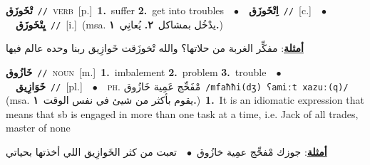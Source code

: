 \documentclass[10pt,a4paper,twoside]{article} %
\begin{document}
\begin{multicols}{2}
{\setlength\topsep{0pt}\textbf{\foreignlanguage{arabic}{تْخَوزَق}}\ {\color{gray}\texttt{//}\color{black}}\ \textsc{verb}\ [p.]\ \textbf{1.}~suffer  \textbf{2.}~get into troubles\ \ $\bullet$\ \ \setlength\topsep{0pt}\textbf{\foreignlanguage{arabic}{اِتْخَوزَق}}\ {\color{gray}\texttt{//}\color{black}}\ [c.]\ \ $\bullet$\ \ \setlength\topsep{0pt}\textbf{\foreignlanguage{arabic}{يِتْخَوزَق}}\ {\color{gray}\texttt{//}\color{black}}\ [i.]\ \color{gray}(msa. \foreignlanguage{arabic}{يدْخُل بمشاكل}~\foreignlanguage{arabic}{\textbf{٢.}}  \foreignlanguage{arabic}{يُعانِي}~\foreignlanguage{arabic}{\textbf{١.}})\color{black}\  \begin{flushright}\color{gray}\foreignlanguage{arabic}{\textbf{\underline{\foreignlanguage{arabic}{أمثلة}}}: مفكِّر الغربة من حلاتها؟ والله تْخوزَقت خَوازِيق ربنا وحده عالم فيها}\end{flushright}\color{black}} \vspace{2mm}

{\setlength\topsep{0pt}\textbf{\foreignlanguage{arabic}{خَازُوق}}\ {\color{gray}\texttt{//}\color{black}}\ \textsc{noun}\ [m.]\ \textbf{1.}~imbalement  \textbf{2.}~problem  \textbf{3.}~trouble\ \ $\bullet$\ \ \setlength\topsep{0pt}\textbf{\foreignlanguage{arabic}{خَوَازِيق}}\ {\color{gray}\texttt{//}\color{black}}\ [pl.]\ \ $\bullet$\ \ \textsc{ph.} \color{gray} \foreignlanguage{arabic}{مْفَحِّج عَمِية خَازُوق}\color{black}\ {\color{gray}\texttt{/{\sffamily mfaħħi(dʒ) ʕamiːt xazuː(q)}/}\color{black}}\ \color{gray} (msa. \foreignlanguage{arabic}{يقوم بأكثر من شيئ في نفس الوقت}~\foreignlanguage{arabic}{\textbf{١.}})\color{black}\ \textbf{1.}~It is an idiomatic expression that means that sb is engaged in more than one task at a time, i.e. Jack of all trades, master of none\  \begin{flushright}\color{gray}\foreignlanguage{arabic}{\textbf{\underline{\foreignlanguage{arabic}{أمثلة}}}: جوزك مْفحِّج عمِية خازُوق\ $\bullet$\ \  تعبت من كثر الخَوازِيق اللي أخذتها بحياتي}\end{flushright}\color{black}} \vspace{2mm}


\end{multicols}
\end{document}
